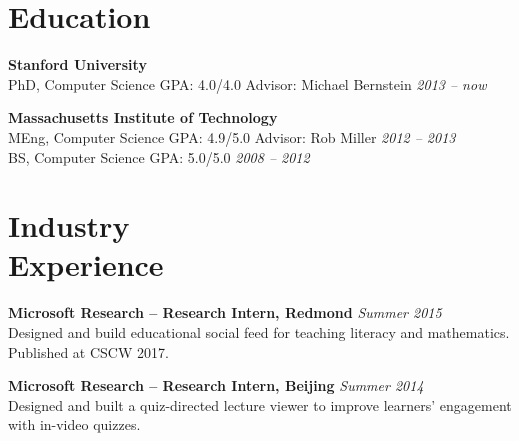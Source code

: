 \documentclass[margin,line]{resume}
\begin{document}
\begin{resume}

\section{\mysidestyle Education}

\textbf{Stanford University} \vspace{0mm}\\\vspace{0mm}%
PhD, Computer Science  \hspace{2.5mm} GPA: 4.0/4.0 \hspace{30mm} Advisor: Michael Bernstein \hfill \textsl{2013 -- now}

\textbf{Massachusetts Institute of Technology} \vspace{0mm}\\\vspace{0mm}%
MEng, Computer Science \hspace{0mm} GPA: 4.9/5.0 \hspace{30mm} Advisor: Rob Miller \hfill \textsl{2012 -- 2013}\\\vspace{1mm}%
BS, Computer Science \hspace{4.5mm} GPA: 5.0/5.0 \hfill \textsl{2008 -- 2012}\vspace{-0.8mm}

\section{\mysidestyle Industry\\Experience}

\textbf{Microsoft Research -- Research Intern, Redmond} \hfill \textsl{Summer 2015}\\
Designed and build educational social feed for teaching literacy and mathematics. Published at CSCW 2017.

\textbf{Microsoft Research -- Research Intern, Beijing} \hfill \textsl{Summer 2014}\\
Designed and built a quiz-directed lecture viewer to improve learners' engagement with in-video quizzes.


\end{resume}
\end{document}
